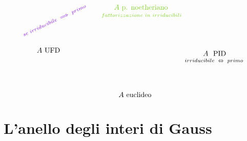 \begin{equation*}
\begin{tikzpicture}[x=0.75pt,y=0.75pt,yscale=-1,xscale=1]
\draw (273.6,34.4) node [anchor=north west][inner sep=0.75pt]  [color={rgb, 255:red, 126; green, 211; blue, 33 }  ,opacity=1 ] [align=left] {$\displaystyle A$ {p. noetheriano}};
\draw (439,121) node [anchor=north west][inner sep=0.75pt]   [align=left] {$\displaystyle A\ $ {PID}};
\draw (130,115) node [anchor=north west][inner sep=0.75pt]   [align=left] {$\displaystyle A$ {UFD}};
\draw (282,198) node [anchor=north west][inner sep=0.75pt]   [align=left] {$\displaystyle A$ {euclideo}};
\draw (405,135.4) node [anchor=north west][inner sep=0.75pt]  [font=\scriptsize]  {$irriducibile\ \Leftrightarrow \ primo$};
\draw (102.65,88.7) node [anchor=north west][inner sep=0.75pt]  [font=\scriptsize,color={rgb, 255:red, 74; green, 144; blue, 226 }  ,opacity=1 ,rotate=-334.88]  {$\textcolor[rgb]{0.56,0.07,1}{se\ irriducibile\ \Longrightarrow \ primo}$};
\draw (250.2,50.6) node [anchor=north west][inner sep=0.75pt]  [font=\scriptsize,color={rgb, 255:red, 126; green, 211; blue, 33 }  ,opacity=1 ]  {$fattorizzazione\ in\ irriducibili$};
\end{tikzpicture}
\end{equation*}



\section{L'anello degli interi di Gauss}
